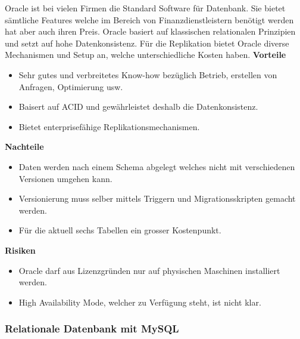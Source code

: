 Oracle ist bei vielen Firmen die Standard Software für Datenbank. Sie bietet sämtliche Features welche im Bereich von Finanzdienstleistern benötigt werden hat aber auch ihren Preis. Oracle basiert auf klassischen relationalen Prinzipien und setzt auf hohe Datenkonsistenz. Für die Replikation bietet Oracle diverse Mechanismen und Setup an, welche unterschiedliche Kosten haben.
\newline
\newline
\textbf{Vorteile}
\begin{itemize}
	\item Sehr gutes und verbreitetes Know-how bezüglich Betrieb, erstellen von Anfragen, Optimierung usw.
	\item Baisert auf \Gls{ACID} und gewährleistet deshalb die Datenkonsistenz.
	\item Bietet enterprisefähige Replikationsmechanismen.
\end{itemize}
\textbf{Nachteile}
\begin{itemize}
	\item Daten werden nach einem Schema abgelegt welches nicht mit verschiedenen Versionen umgehen kann.
	\item Versionierung muss selber mittels Triggern und Migrationsskripten gemacht werden.	
	\item Für die aktuell sechs Tabellen ein grosser Kostenpunkt. 
\end{itemize}
\textbf{Risiken}
\begin{itemize}
	\item Oracle darf aus Lizenzgründen nur auf physischen Maschinen installiert werden.
	\item High Availability Mode, welcher zu Verfügung steht, ist nicht klar.
\end{itemize}

\subsubsection{Relationale Datenbank mit MySQL}

